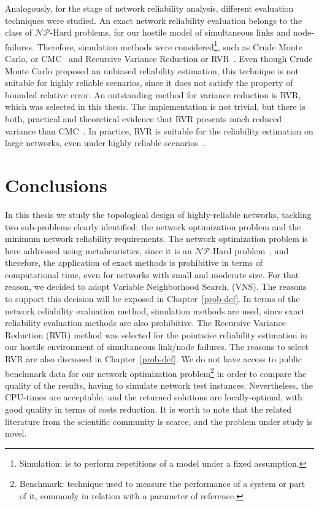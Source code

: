Analogously, for the stage of network reliability analysis, different evaluation techniques were studied. 
An exact network reliability evaluation belongs to the 
class of $\mathcal{NP}$-Hard problems, for our hostile model of simultaneous links and node-failures. 
Therefore, simulation methods were considered\footnote{Simulation: is to perform repetitions of a model under a fixed assumption.}, such as Crude Monte Carlo, or CMC~\cite{4} and 
Recursive Variance Reduction or RVR~\cite{85,2,78}. Even though Crude Monte Carlo proposed an unbiased reliability estimation, this technique is not suitable for highly reliable scenarios, since it does not satisfy the property of bounded relative error. An outstanding method for variance reduction is RVR, which was selected in this thesis. 
The implementation is not trivial, but there is both, practical and theoretical evidence that RVR presents much reduced variance than CMC~\cite{80}. In practice, RVR is suitable for the reliability estimation on large networks,  
even under highly reliable scenarios~\cite{79}.

\section{Conclusions}
In this thesis we study the topological design of highly-reliable networks, tackling two sub-problems clearly identified: the network optimization problem and the minimum network reliability requirements. The network optimization problem is here addressed using metaheuristics, since it is an $\mathcal{NP}$-Hard problem~\cite{9,27,29}, and therefore, the application of exact methods is prohibitive in terms of computational time, even for networks with small and moderate size. For that reason, we decided to adopt Variable Neighborhood Search, 
(VNS). The reasons to support this decision will be exposed in Chapter~\ref{prob-def}. In terms of the 
network reliability evaluation method, simulation methods are used, since exact reliability evaluation methods are also prohibitive. The Recursive Variance Reduction (RVR) method was selected for the pointwise reliability estimation in our hostile environment of simultaneous link/node failures. The reasons to select RVR are also discussed in Chapter~\ref{prob-def}. We do not have access to public benchmark data for our network optimization problem\footnote{Benchmark: technique used to measure the performance of a system or part of it, commonly in relation with a parameter of reference.} in order to compare the quality of the results, having to simulate network test instances. Nevertheless, 
the CPU-times are acceptable, and the returned solutions are locally-optimal, with good quality in terms of costs reduction.  
It is worth to note that the related literature from the scientific community is scarce, and the problem under study is novel. 

